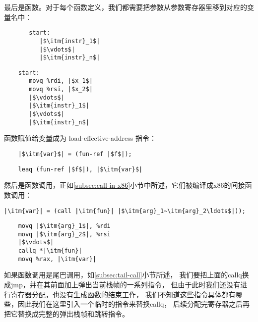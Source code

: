 最后是函数。对于每个函数定义，我们都需要把参数从参数寄存器里移到对应的变量名中：
\begin{transformation}
\begin{lstlisting}
       start:
          |$\itm{instr}_1$|
          |$\vdots$|
          |$\itm{instr}_n$|
\end{lstlisting}
\compilesto
\begin{lstlisting}
    start:
       movq %rdi, |$x_1$|
       movq %rsi, |$x_2$|
       |$\vdots$|
       |$\itm{instr}_1$|
       |$\vdots$|
       |$\itm{instr}_n$|
\end{lstlisting}
\end{transformation}

函数赋值给变量成为 load-effective-address 指令：
\begin{transformation}
\begin{lstlisting}
    |$\itm{var}$| = (fun-ref |$f$|);
\end{lstlisting}
\compilesto
\begin{lstlisting}
    leaq (fun-ref |$f$|), |$\itm{var}$|
\end{lstlisting}
\end{transformation}

然后是函数调用，正如\ref{subsec:call-in-x86}小节中所述，它们被编译成x86的间接函数调用：
\begin{transformation}
\begin{lstlisting}
|\itm{var}| = (call |\itm{fun}| |$\itm{arg}_1~\itm{arg}_2\ldots$|));
\end{lstlisting}
\compilesto
\begin{lstlisting}
    movq |$\itm{arg}_1$|, %rdi
    movq |$\itm{arg}_2$|, %rsi
    |$\vdots$|
    callq *|\itm{fun}|
    movq %rax, |\itm{var}|
\end{lstlisting}
\end{transformation}

如果函数调用是尾巴调用，如\ref{subsec:tail-call}小节所述，
我们要把上面的callq换成jmp，并在其前面加上弹出当前栈帧的一系列指令，
但由于此时我们还没有进行寄存器分配，也没有生成函数的结束工作，
我们不知道这些指令具体都有哪些，因此我们在这里引入一个临时的指令来替换callq，
后续分配完寄存器之后再把它替换成完整的弹出栈帧和跳转指令。

